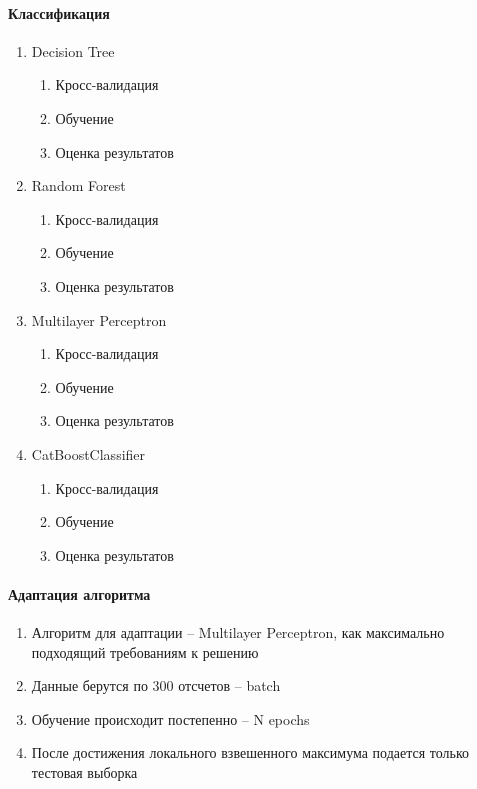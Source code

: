         \paragraph{Классификация}
        \noindent 
        
        \noindent
        \begin{enumerate}
            \item Decision Tree
            \begin{enumerate}
                \item Кросс-валидация
                \item Обучение
                \item Оценка результатов
            \end{enumerate}
            \item Random Forest
            \begin{enumerate}
                \item Кросс-валидация
                \item Обучение
                \item Оценка результатов
            \end{enumerate}
            \item Multilayer Perceptron
            \begin{enumerate}
                \item Кросс-валидация
                \item Обучение
                \item Оценка результатов
            \end{enumerate}
            \item CatBoostClassifier
            \begin{enumerate}
                \item Кросс-валидация
                \item Обучение
                \item Оценка результатов
            \end{enumerate}
        \end{enumerate}
        
        \paragraph{Адаптация алгоритма}
            \begin{enumerate}
                \item Алгоритм для адаптации – Multilayer Perceptron, как максимально подходящий требованиям к решению
                \item Данные берутся по 300 отсчетов --  batch
                \item Обучение происходит постепенно -- N epochs
                \item После достижения локального взвешенного максимума подается только тестовая выборка
            \end{enumerate}
        
